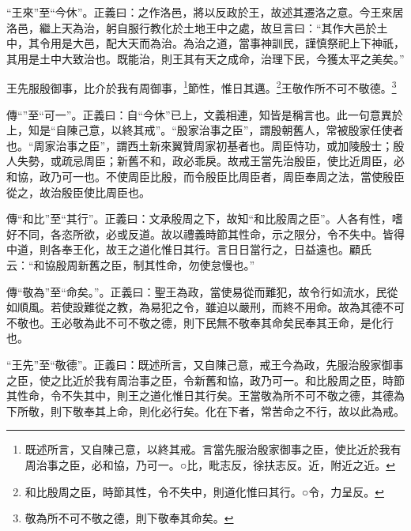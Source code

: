 {\noindent\shu{}\fzkt “王來”至“今休”。正義曰：之作洛邑，將以反政於王，故述其遷洛之意。今王來居洛邑，繼上天為治，躬自服行教化於土地王中之處，故旦言曰：“其作大邑於土中，其令用是大邑，配大天而為治。為治之道，當事神訓民，謹慎祭祀上下神祇，其用是土中大致治也。既能治，則王其有天之成命，治理下民，今獲太平之美矣。” \par}

王先服殷御事，比介於我有周御事，\footnote{既述所言，又自陳己意，以終其戒。言當先服治殷家御事之臣，使比近於我有周治事之臣，必和協，乃可一。○比，毗志反，徐扶志反。近，附近之近。}節性，惟日其邁。\footnote{和比殷周之臣，時節其性，令不失中，則道化惟曰其行。○令，力呈反。}王敬作所不可不敬德。\footnote{敬為所不可不敬之德，則下敬奉其命矣。}


{\noindent\zhuan{}\fzbyks 傳“”至“可一”。正義曰：自“今休”已上，文義相連，知皆是稱言也。此一句意異於上，知是“自陳己意，以終其戒”。“殷家治事之臣”，謂殷朝舊人，常被殷家任使者也。“周家治事之臣”，謂西土新來翼贊周家初基者也。周臣恃功，或加陵殷士；殷人失勢，或疏忌周臣；新舊不和，政必乖戾。故戒王當先治殷臣，使比近周臣，必和協，政乃可一也。不使周臣比殷，而令殷臣比周臣者，周臣奉周之法，當使殷臣從之，故治殷臣使比周臣也。 \par}

{\noindent\zhuan{}\fzbyks 傳“和比”至“其行”。正義曰：文承殷周之下，故知“和比殷周之臣”。人各有性，嗜好不同，各恣所欲，必或反道。故以禮義時節其性命，示之限分，令不失中。皆得中道，則各奉王化，故王之道化惟日其行。言日日當行之，日益遠也。顧氏云：“和協殷周新舊之臣，制其性命，勿使怠慢也。” \par}

{\noindent\zhuan{}\fzbyks 傳“敬為”至“命矣。”。正義曰：聖王為政，當使易從而難犯，故令行如流水，民從如順風。若使設難從之教，為易犯之令，雖迫以嚴刑，而終不用命。故為其德不可不敬也。王必敬為此不可不敬之德，則下民無不敬奉其命矣民奉其王命，是化行也。 \par}

{\noindent\shu{}\fzkt “王先”至“敬德”。正義曰：既述所言，又自陳己意，戒王今為政，先服治殷家御事之臣，使之比近於我有周治事之臣，令新舊和協，政乃可一。和比殷周之臣，時節其性命，令不失其中，則王之道化惟日其行矣。王當敬為所不可不敬之德，其德為下所敬，則下敬奉其上命，則化必行矣。化在下者，常苦命之不行，故以此為戒。 \par}

